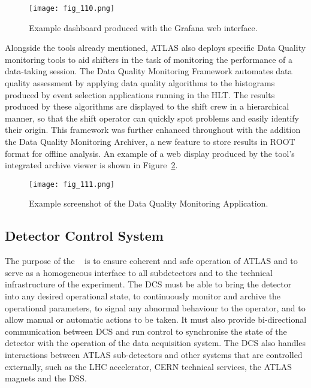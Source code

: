 \documentclass[cernpreprint, atlasdraft=false, UKenglish,british,orcidlogo, texmf, orcidlogo]{atlasdoc}
\begin{document}
\begin{figure}[htbp!]
\centerline{\texttt{[image: fig\_110.png]}}
\caption{Example dashboard produced with the Grafana web interface.}
\label{fig:TDAQ_DAQHLT_grafana}
\end{figure}
 
Alongside the tools already mentioned, ATLAS also deploys specific Data Quality monitoring tools
to aid shifters in the task of monitoring the performance of a data-taking session. The Data Quality Monitoring Framework automates data quality assessment by applying data quality algorithms to the histograms produced by event selection applications running in the \gls{HLT}. The results produced by these algorithms are displayed to the shift crew in a hierarchical manner, so that the shift operator can quickly spot problems and easily identify their origin. This framework was further enhanced throughout \RunTwo with the addition the Data Quality Monitoring Archiver, a new feature to store results in ROOT format for offline analysis. An example of a web display produced by the tool's integrated archive viewer is shown in Figure~\ref{fig:TDAQ_DAQHLT_DQMA}.
 
\begin{figure}[htbp!]
\centerline{\texttt{[image: fig\_111.png]}}
\caption{Example screenshot of the Data Quality Monitoring Application.}
\label{fig:TDAQ_DAQHLT_DQMA}
\end{figure}
 
\subsection{Detector Control System\label{sec:DCS}}

 
The purpose of the ~\cite{ATLAS_DCS_Jinst} is to ensure coherent and safe operation of ATLAS and to serve as a homogeneous interface to all subdetectors and to the technical infrastructure of the experiment.
The \gls{DCS} must be able to bring the
detector into any desired operational state, to continuously monitor
and archive the operational parameters, to signal any abnormal
behaviour to the operator, and to allow manual or automatic actions to
be taken.
It must also provide bi-directional
communication between \gls{DCS} and run control to synchronise the state of the detector with the
operation of the data acquisition system.
The \gls{DCS} also handles interactions between ATLAS
sub-detectors and other systems that are controlled externally,
such as the \gls{LHC} accelerator, CERN technical services, the ATLAS
magnets and the \gls{DSS}.
 
\end{document}
